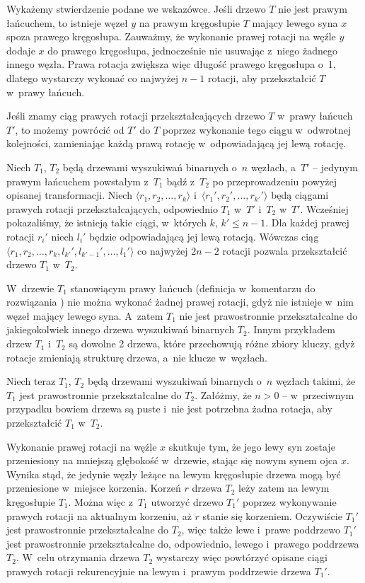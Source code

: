\noindent Wykażemy stwierdzenie podane we wskazówce.
Jeśli drzewo $T$ nie jest prawym łańcuchem, to istnieje węzeł $y$ na prawym kręgosłupie $T$ mający lewego syna $x$ spoza prawego kręgosłupa.
Zauważmy, że wykonanie prawej rotacji na węźle $y$ dodaje $x$ do prawego kręgosłupa, jednocześnie nie usuwając z~niego żadnego innego węzła.
Prawa rotacja zwiększa więc długość prawego kręgosłupa o~1, dlatego wystarczy wykonać co najwyżej $n-1$ rotacji, aby przekształcić $T$ w~prawy łańcuch.

Jeśli znamy ciąg prawych rotacji przekształcających drzewo $T$ w~prawy łańcuch $T'$, to możemy powrócić od $T'$ do $T$ poprzez wykonanie tego ciągu w~odwrotnej kolejności, zamieniając każdą prawą rotację w~odpowiadającą jej lewą rotację.

Niech $T_1$, $T_2$ będą drzewami wyszukiwań binarnych o~$n$ węzłach, a~$T'$ -- jedynym prawym łańcuchem powstałym z~$T_1$ bądź z~$T_2$ po przeprowadzeniu powyżej opisanej transformacji.
Niech $\langle r_1,r_2,\dots,r_k\rangle$ i~$\langle r_1',r_2',\dots,r_{k'}'\rangle$ będą ciągami prawych rotacji przekształcających, odpowiednio $T_1$ w~$T'$ i~$T_2$ w~$T'$.
Wcześniej pokazaliśmy, że istnieją takie ciągi, w~których $k$, $k'\le n-1$.
Dla każdej prawej rotacji $r_i'$ niech $l_i'$ będzie odpowiadającą jej lewą rotacją.
Wówczas ciąg $\langle r_1,r_2,\dots,r_k,l_{k'}',l_{k'-1}',\dots,l_1'\rangle$ co najwyżej $2n-2$ rotacji pozwala przekształcić drzewo $T_1$ w~$T_2$.

\exercise %

\noindent W~drzewie $T_1$ stanowiącym prawy łańcuch (definicja w~komentarzu do rozwiązania ) nie można wykonać żadnej prawej rotacji, gdyż nie istnieje w~nim węzeł mający lewego syna.
A~zatem $T_1$ nie jest prawostronnie przekształcalne do jakiegokolwiek innego drzewa wyszukiwań binarnych $T_2$.
Innym przykładem drzew $T_1$ i~$T_2$ są dowolne 2 drzewa, które przechowują różne zbiory kluczy, gdyż rotacje zmieniają strukturę drzewa, a~nie klucze w~węzłach.

Niech teraz $T_1$, $T_2$ będą drzewami wyszukiwań binarnych o~$n$ węzłach takimi, że $T_1$ jest prawostronnie przekształcalne do $T_2$.
Załóżmy, że $n>0$ -- w~przeciwnym przypadku bowiem drzewa są puste i~nie jest potrzebna żadna rotacja, aby przekształcić $T_1$ w~$T_2$.

Wykonanie prawej rotacji na węźle $x$ skutkuje tym, że jego lewy syn zostaje przeniesiony na mniejszą głębokość w~drzewie, stając się nowym synem ojca $x$.
Wynika stąd, że jedynie węzły leżące na lewym kręgosłupie drzewa mogą być przeniesione w~miejsce korzenia.
Korzeń $r$ drzewa $T_2$ leży zatem na lewym kręgosłupie $T_1$.
Można więc z~$T_1$ utworzyć drzewo $T_1'$ poprzez wykonywanie prawych rotacji na aktualnym korzeniu, aż $r$ stanie się korzeniem.
Oczywiście $T_1'$ jest prawostronnie przekształcalne do $T_2$, więc także lewe i~prawe poddrzewo $T_1'$ jest prawostronnie przekształcalne do, odpowiednio, lewego i~prawego poddrzewa $T_2$.
W~celu otrzymania drzewa $T_2$ wystarczy więc powtórzyć opisane ciągi prawych rotacji rekurencyjnie na lewym i~prawym poddrzewie drzewa $T_1'$.


